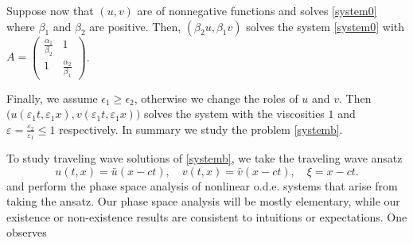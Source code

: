 \documentclass{amsart}
\theoremstyle{definition}
\numberwithin{equation}{section}
\begin{document}
Suppose now that $(u,v)$ are of nonnegative functions and solves \eqref{system0} where $\beta_1$ and $\beta_2$ are positive. Then, $(\beta_2u,\beta_1 v)$ solves the system \eqref{system0} with $A = \begin{pmatrix} \frac{\alpha_1}{\beta_2} & 1 \\ 1 & \frac{\alpha_2}{\beta_1} \end{pmatrix}$. 

Finally, we assume $\epsilon_1\ge \epsilon_2$, otherwise we change the roles of $u$ and $v$. Then $\big(u(\varepsilon_1 t, \varepsilon_1 x), v(\varepsilon_1 t, \varepsilon_1 x)\big)$ solves the system with the viscosities $1$ and $\varepsilon=\frac{\varepsilon_2}{\varepsilon_1}\le 1$ respectively. In summary we study the problem \eqref{systemb}.



\bigskip

To study traveling wave solutions of \eqref{systemb}, we take the traveling wave ansatz
$$u(t,x) = \bar{u}(x-ct), \quad v(t,x) = \bar{v}(x-ct), \quad \xi = x-ct.$$
and perform the phase space analysis of nonlinear o.d.e. systems that arise from taking the ansatz. Our phase space analysis will be mostly elementary, while our existence or non-existence results are consistent to intuitions or expectations. One observes 
\end{document}
